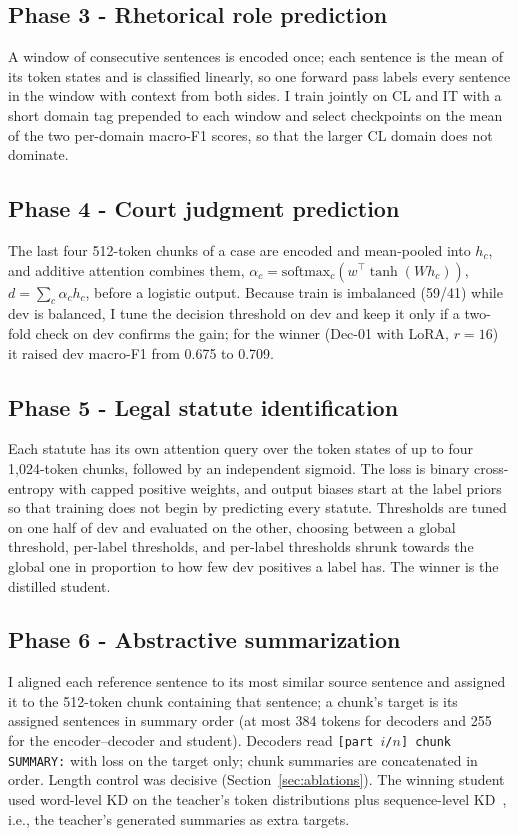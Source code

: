\documentclass[11pt, oneside]{article}
\begin{document}
\subsection{Phase 3 - Rhetorical role prediction}
\vspace{-5pt}
A window of consecutive sentences is encoded once; each sentence is the mean of its token states and is classified linearly, so one forward pass labels every sentence in the window with context from both sides. I train jointly on CL and IT with a short domain tag prepended to each window and select checkpoints on the mean of the two per-domain macro-F1 scores, so that the larger CL domain does not dominate.

\subsection{Phase 4 - Court judgment prediction}
\vspace{-5pt}
The last four 512-token chunks of a case are encoded and mean-pooled into $h_c$, and additive attention combines them, $\alpha_c=\mathrm{softmax}_c(w^\top\tanh(Wh_c))$, $d=\sum_c\alpha_c h_c$, before a logistic output. Because train is imbalanced (59/41) while dev is balanced, I tune the decision threshold on dev and keep it only if a two-fold check on dev confirms the gain; for the winner (Dec-01 with LoRA, $r=16$) it raised dev macro-F1 from 0.675 to 0.709.

\subsection{Phase 5 - Legal statute identification}
\vspace{-5pt}
Each statute has its own attention query over the token states of up to four 1,024-token chunks, followed by an independent sigmoid. The loss is binary cross-entropy with capped positive weights, and output biases start at the label priors so that training does not begin by predicting every statute. Thresholds are tuned on one half of dev and evaluated on the other, choosing between a global threshold, per-label thresholds, and per-label thresholds shrunk towards the global one in proportion to how few dev positives a label has. The winner is the distilled student.

\subsection{Phase 6 - Abstractive summarization}
\vspace{-5pt}
I aligned each reference sentence to its most similar source sentence and assigned it to the 512-token chunk containing that sentence; a chunk's target is its assigned sentences in summary order (at most 384 tokens for decoders and 255 for the encoder--decoder and student). Decoders read \texttt{[part $i$/$n$] chunk SUMMARY:} with loss on the target only; chunk summaries are concatenated in order. Length control was decisive (Section~\ref{sec:ablations}). The winning student used word-level KD on the teacher's token distributions plus sequence-level KD~\cite{kim2016seqkd}, i.e., the teacher's generated summaries as extra targets.
\end{document}
